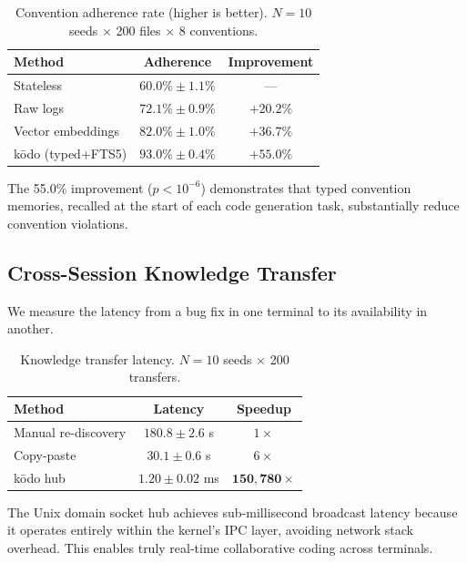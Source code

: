 \documentclass{article}
\begin{document}
\begin{table}[h]
\centering
\caption{Convention adherence rate (higher is better). $N = 10$ seeds $\times$ 200 files $\times$ 8 conventions.}
\label{tab:conventions}
\begin{tabular}{lcc}
\toprule
\textbf{Method} & \textbf{Adherence} & \textbf{Improvement} \\
\midrule
Stateless & $60.0\% \pm 1.1\%$ & --- \\
Raw logs & $72.1\% \pm 0.9\%$ & $+20.2\%$ \\
Vector embeddings & $82.0\% \pm 1.0\%$ & $+36.7\%$ \\
k\=odo (typed+FTS5) & $\mathbf{93.0\% \pm 0.4\%}$ & $\mathbf{+55.0\%}$ \\
\bottomrule
\end{tabular}
\end{table}

The 55.0\% improvement ($p < 10^{-6}$) demonstrates that typed convention memories, recalled at the start of each code generation task, substantially reduce convention violations.

\subsection{Cross-Session Knowledge Transfer}
\label{sec:transfer}

We measure the latency from a bug fix in one terminal to its availability in another.

\begin{table}[h]
\centering
\caption{Knowledge transfer latency. $N = 10$ seeds $\times$ 200 transfers.}
\label{tab:transfer}
\begin{tabular}{lcc}
\toprule
\textbf{Method} & \textbf{Latency} & \textbf{Speedup} \\
\midrule
Manual re-discovery & $180.8 \pm 2.6$ s & $1\times$ \\
Copy-paste & $30.1 \pm 0.6$ s & $6\times$ \\
k\=odo hub & $\mathbf{1.20 \pm 0.02}$ ms & $\mathbf{150{,}780\times}$ \\
\bottomrule
\end{tabular}
\end{table}

The Unix domain socket hub achieves sub-millisecond broadcast latency because it operates entirely within the kernel's IPC layer, avoiding network stack overhead. This enables truly real-time collaborative coding across terminals.
\end{document}
